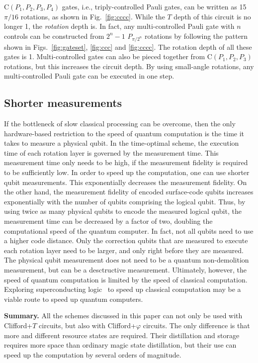 \documentclass[prx,aps,letterpaper,twocolumn,allowfontchageintitle=true,accepted=2019-02-01]{quantumarticle}
\begin{document}
$\mathrm{C}(P_1,P_2,P_3,P_4)$ gates, i.e., triply-controlled Pauli gates, can be written as 15 $\pi/16$ rotations, as shown in Fig.~\ref{fig:cccc}. While the $T$ depth of this circuit is no longer 1, the \textit{rotation} depth is. In fact, any multi-controlled Pauli gate with $n$ controls can be constructed from $2^n-1$ $P_{\pi/2^n}$ rotations by following the pattern shown in Figs.~\ref{fig:gateset}, \ref{fig:ccc} and \ref{fig:cccc}. The rotation depth of all these gates is 1. Multi-controlled gates can also be pieced together from $\mathrm{C}(P_1,P_2,P_3)$ rotations, but this increases the circuit depth. By using small-angle rotations, any multi-controlled Pauli gate can be executed in one step.





\subsection{Shorter measurements}

If the bottleneck of slow classical processing can be overcome, then the only hardware-based restriction to the speed of quantum computation is the time it takes to measure a physical qubit. In the time-optimal scheme, the execution time of each rotation layer is governed by the measurement time. This measurement time only needs to be high, if the measurement fidelity is required to be sufficiently low. In order to speed up the computation, one can use shorter qubit measurements. This exponentially decreases the measurement fidelity. On the other hand, the measurement fidelity of encoded surface-code qubits increases exponentially with the number of qubits comprising the logical qubit. Thus, by using twice as many physical qubits to encode the measured logical qubit, the measurement time can be decreased by a factor of two, doubling the computational speed of the quantum computer. In fact, not all qubits need to use a higher code distance. Only the correction qubits that are measured to execute each rotation layer need to be larger, and only right before they are measured. The physical qubit measurement does not need to be a quantum non-demolition measurement, but can be a desctructive measurement. Ultimately, however, the speed of quantum computation is limited by the speed of classical computation. Exploring superconducting logic~\cite{Likharev1991} to speed up classical computation may be a viable route to speed up quantum computers.

\textbf{Summary.} All the schemes discussed in this paper can not only be used with Clifford+$T$ circuits, but also with Clifford+$\varphi$ circuits. The only difference is that more and different resource states are required. Their distillation and storage requires more space than ordinary magic state distillation, but their use can speed up the computation by several orders of magnitude.
\end{document}
